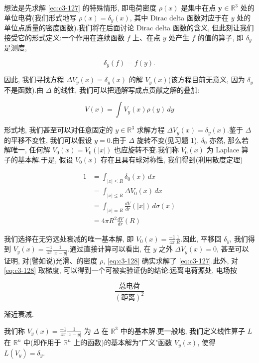 想法是先求解 \eqref{eq:c3-127} 的特殊情形, 即电荷密度 $\rho(x)$ 是集中在点 $\boldsymbol{y}\in\mathbb{R}^3$ 处的单位电荷(我们形式地写 $\rho(x) = \delta_y(x)$, 其中 Dirac delta 函数对应于在 $y$ 处的单位点质量的密度函数).我们将在后面讨论 Dirac delta 函数的含义, 但此刻让我们接受它的形式定义:一个作用在连续函数 $f$ 上、在点 $y$ 处产生 $f$ 的值的算子, 即 $\delta_y$ 是测度,

\[
\delta_y(f) = f(y).
\]

因此, 我们寻找方程 $\Delta V_y(x) = \delta_y(x)$ 的解 $V_y(x)$(该方程目前无意义, 因为 $\delta_y$ 不是函数).由 $\Delta$ 的线性, 我们可以把通解写成点贡献之解的叠加:

\begin{equation}
V(x) = \int V_y(x)\rho(y)\, dy\label{eq:c3-128}
\end{equation}

形式地, 我们甚至可以对任意固定的 $y\in\mathbb{R}^3$ 求解方程 $\Delta V_y(x) = \delta_y(x)$.鉴于 $\Delta$ 的平移不变性, 我们可以假设 $y=0$.由于 $\Delta$ 旋转不变(见习题 1), $\delta_0$ 亦然, 那么若解唯一, 任何解 $V_0(x) = V_0(|x|)$ 也应旋转不变.我们称 $V_0(x)$ 为 Laplace 算子的基本解.于是, 假设 $V_0(x)$ 存在且具有球对称性, 我们得到(利用散度定理)

\[
\begin{aligned}
1 &= \int_{|x|\leq R}\delta_0(x)\, dx \\
&= \int_{|x|\leq R}\Delta V_0(x)\, dx \\
&= \int_{|x|=R}\frac{dV}{dr}(|x|)\, d\sigma(x) \\
&= 4\pi R^2\frac{dV}{dr}(R)
\end{aligned}
\]

我们选择在无穷远处衰减的唯一基本解, 即 $V_0(x) = \frac{-1}{4\pi}\frac{1}{R}$.因此, 平移回 $\delta_y$, 我们得到 $V_y(x) = \frac{-1}{4\pi}\frac{1}{|x-y|}$.通过直接计算可以看出, 在 $y$ 之外 $\Delta V_y(x) = 0$, 甚至可以证明, 对(譬如说)光滑、的密度 $\rho$, \eqref{eq:c3-128} 确实求解了 \eqref{eq:c3-127}.此外, 对 \eqref{eq:c3-128} 取梯度, 可以得到一个可被实验证伪的结论:远离电荷源处, 电场按

\[
\frac{\text{总电荷}}{(\text{距离})^2}
\]

渐近衰减.

\begin{definition*}
我们称 $V_y(x) = \frac{-1}{4\pi}\frac{1}{|x-y|}$ 为 $\Delta$ 在 $\mathbb{R}^3$ 中的基本解.更一般地, 我们定义线性算子 $L$ 在 $\mathbb{R}^n$ 中(即作用于 $\mathbb{R}^n$ 上的函数)的基本解为"广义"函数 $V_y(x)$, 使得 $L(V_y) = \delta_y$.
\end{definition*}

